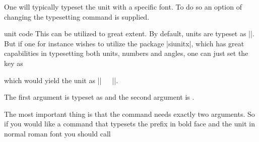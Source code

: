 One will typically typeset the unit with a specific font. To do so an option of changing the typesetting command is supplied.
\begin{pgfplotscodetwokey}{unit code}%
  This can be utilized to great extent. By default, units are typeset as ||. But if one for instance
  wishes to utilize the package |siunitx|, which has great capabilities in typesetting both units, numbers and angles, one can just set the key as
\begin{codeexample}
\end{codeexample}
  which would yield the unit as |\si{||}|. 

  The first argument is typeset as  and the second argument is .
  
  The most important thing is that the command needs exactly two arguments. So if you would like a command that typesets the prefix in bold face and the
  unit in normal roman font you should call
\begin{codeexample}[code only]
\pgfplotsset{unit code/.code 2 args={\mathbf{#1}\mathrm{#2}}
\end{codeexample}
\end{pgfplotscodetwokey}


